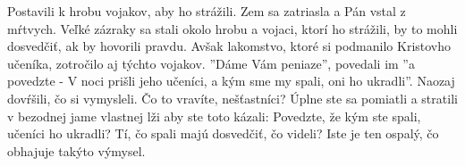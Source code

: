 Postavili k hrobu vojakov, aby ho strážili.
Zem sa zatriasla a Pán vstal z mŕtvych. Veľké zázraky sa stali okolo hrobu a vojaci, ktorí ho strážili, by to mohli dosvedčiť, ak by hovorili pravdu. Avšak lakomstvo, ktoré si podmanilo Kristovho učeníka, zotročilo aj týchto vojakov. 
''Dáme Vám peniaze'', povedali im ''a povedzte - V noci prišli jeho učeníci, a kým sme my spali, oni ho ukradli''. Naozaj dovŕšili, čo si vymysleli.
Čo to vravíte, nešťastníci? Úplne ste sa pomiatli a stratili v bezodnej jame vlastnej lži aby ste toto kázali: Povedzte, že kým ste spali, učeníci ho ukradli? Tí, čo spali majú dosvedčiť, čo videli?
Iste je ten ospalý, čo obhajuje takýto výmysel.
